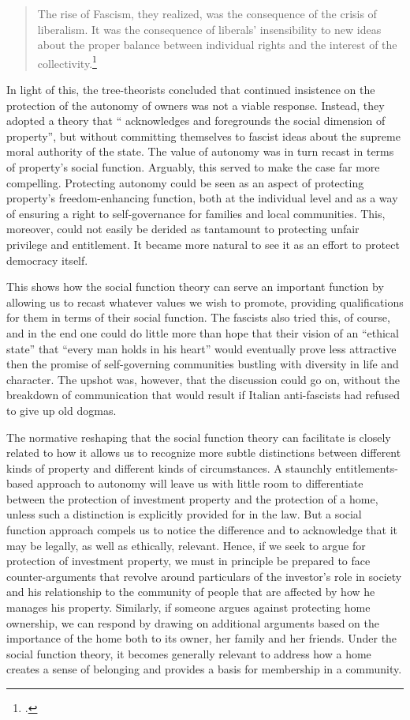 \begin{quote}
The rise of Fascism, they realized, was the
consequence of the crisis of liberalism. It was the consequence of liberals' insensibility to new ideas about the proper balance between individual rights and the interest of the collectivity.\footcite[907]{robilant13}
\end{quote}

In light of this, the tree-theorists concluded that continued insistence on the protection of the autonomy of owners was not a viable response. Instead, they adopted a theory that `` acknowledges and foregrounds the social dimension of property'', but without committing themselves to fascist ideas about the supreme moral authority of the state. The value of autonomy was in turn recast in terms of property's social function. Arguably, this served to make the case far more compelling. Protecting autonomy could be seen as an aspect of protecting property's freedom-enhancing function, both at the individual level and as a way of ensuring a right to self-governance for families and local communities. This, moreover, could not easily be derided as tantamount to protecting unfair privilege and entitlement. It became more natural to see it as an effort to protect democracy itself.

This shows how the social function theory can serve an important function by allowing us to recast whatever values we wish to promote, providing qualifications for them in terms of their social function. The fascists also tried this, of course, and in the end one could do little more than hope that their vision of an ``ethical state'' that ``every man holds in his heart'' would eventually prove less attractive then the promise of self-governing communities bustling with diversity in life and character. The upshot was, however, that the discussion could go on, without the breakdown of communication that would result if Italian anti-fascists had refused to give up old dogmas. 

The normative reshaping that the social function theory can facilitate is closely related to how it allows us to recognize more subtle distinctions between different kinds of property and different kinds of circumstances. A staunchly entitlements-based approach to autonomy will leave us with little room to differentiate between the protection of investment property and the protection of a home, unless such a distinction is explicitly provided for in the law. But a social function approach compels us to notice the difference and to acknowledge that it may be legally, as well as ethically, relevant. Hence, if we seek to argue for protection of investment property, we must in principle be prepared to face counter-arguments that revolve around particulars of the investor's role in society and his relationship to the community of people that are affected by how he manages his property. Similarly, if someone argues against protecting home ownership, we can respond by drawing on additional arguments based on the importance of the home both to its owner, her family and her friends. Under the social function theory, it becomes generally relevant to address how a home creates a sense of belonging and provides a basis for membership in a community.

